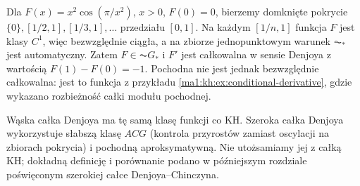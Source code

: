 \begin{przyklad}
Dla $F(x)=x^2\cos(\pi/x^2)$, $x>0$, $F(0)=0$, bierzemy domknięte pokrycie $\{0\},[1/2,1],[1/3,1],\dots$ przedziału $[0,1]$. Na każdym $[1/n,1]$ funkcja $F$ jest klasy $C^1$, więc bezwzględnie ciągła, a na zbiorze jednopunktowym warunek $\AC_*$ jest automatyczny. Zatem $F\in\AC G_*$ i $F'$ jest całkowalna w sensie Denjoya z wartością $F(1)-F(0)=-1$. Pochodna nie jest jednak bezwzględnie całkowalna: jest to funkcja z przykładu \ref{ma1:kh:ex:conditional-derivative}, gdzie wykazano rozbieżność całki modułu pochodnej.
\end{przyklad}
\begin{uwaga}
Wąska całka Denjoya ma tę samą klasę funkcji co KH. Szeroka całka Denjoya wykorzystuje słabszą klasę $ACG$ (kontrola przyrostów zamiast oscylacji na zbiorach pokrycia) i pochodną aproksymatywną. Nie utożsamiamy jej z całką KH; dokładną definicję i porównanie podano w późniejszym rozdziale poświęconym szerokiej całce Denjoya--Chinczyna.
\end{uwaga}


